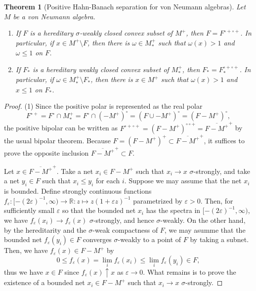\documentclass[a4paper]{amsart}
\newcommand{\e}{\varepsilon}
\theoremstyle{plain}
\newtheorem{thm}{Theorem}[section]
\theoremstyle{definition}
\begin{document}
\begin{thm}[Positive Hahn-Banach separation for von Neumann algebras]
Let $M$ be a von Neumann algebra.
\begin{enumerate}
\item If $F$ is a hereditary $\sigma$-weakly closed convex subset of $M^+$, then $F=F^{\circ+\circ+}$. In particular, if $x\in M^+\setminus F$, then there is $\omega\in M_*^+$ such that $\omega(x)>1$ and $\omega\le1$ on $F$.
\item If $F_*$ is a hereditary weakly closed convex subset of $M_*^+$, then $F_*=F_*^{\circ+\circ+}$. In particular, if $\omega\in M_*^+\setminus F_*$, then there is $x\in M^+$ such that $\omega(x)>1$ and $x\le1$ on $F_*$.
\end{enumerate}
\end{thm}
\begin{proof}
(1)
Since the positive polar is represented as the real polar
\[F^{\circ+}=F^\circ\cap M_*^+=F^\circ\cap(-M^+)^\circ=(F\cup-M^+)^\circ=(F-M^+)^\circ,\]
the positive bipolar can be written as $F^{\circ+\circ+}=(F-M^+)^{\circ\circ+}=\overline{F-M^+}^+$ by the usual bipolar theorem.
Because $F=(F-M^+)^+\subset\overline{F-M^+}^+$, it suffices to prove the opposite inclusion $\overline{F-M^+}^+\subset F$.

Let $x\in\overline{F-M^+}^+$.
Take a net $x_i\in F-M^+$ such that $x_i\to x$ $\sigma$-strongly, and take a net $y_i\in F$ such that $x_i\le y_i$ for each $i$.
Suppose we may assume that the net $x_i$ is bounded.
Define strongly continuous functions $f_\e:[-(2\e)^{-1},\infty)\to\mathbb{R}:z\mapsto z(1+\e z)^{-1}$ parametrized by $\e>0$.
Then, for sufficiently small $\e$ so that the bounded net $x_i$ has the spectra in $[-(2\e)^{-1},\infty)$, we have $f_\e(x_i)\to f_\e(x)$ $\sigma$-strongly, and hence $\sigma$-weakly.
On the other hand, by the hereditarity and the $\sigma$-weak compactness of $F$, we may asumme that the bounded net $f_\e(y_i)\in F$ converges $\sigma$-weakly to a point of $F$ by taking a subnet.
Then, we have $f_\e(x)\in F-M^+$ by
\[0\le f_\e(x)=\lim_if_\e(x_i)\le\lim_if_\e(y_i)\in F,\]
thus we have $x\in F$ since $f_\e(x)\uparrow x$ as $\e\to0$.
What remains is to prove the existence of a bounded net $x_i\in F-M^+$ such that $x_i\to x$ $\sigma$-strongly.


\end{proof}
\end{document}
